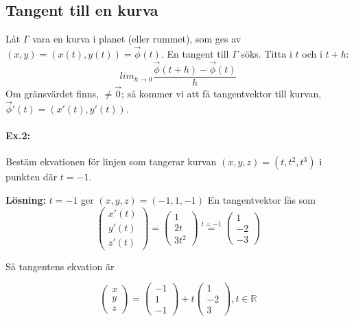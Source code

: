 \documentclass[a4paper,12pt]{article}
\begin{document}
\subsection{Tangent till en kurva}
Låt $\Gamma$ vara en kurva i planet (eller rummet), som ges av
$(x,y) = (x(t),y(t)) = \vec{\phi}(t)$. En tangent till $\Gamma$ söks.
Titta i $t$ och i $t+h$:
\begin{equation*}
  lim_{h \to 0}\frac{\vec{\phi}(t+h)-\vec{\phi}(t)}{h}
\end{equation*}
Om gränsvärdet finns, $\neq\vec{0}$; så kommer vi att få tangentvektor till
kurvan, $\vec{\phi}'(t) = (x'(t),y'(t))$.

\paragraph{Ex.2:}
  Bestäm ekvationen för linjen som tangerar kurvan $(x,y,z) = (t, t^2, t^3)$ i
  punkten där $t = -1$.

  \textbf{Lösning:} $t = -1$ ger $(x,y,z) = (-1,1,-1)$ En tangentvektor fås som
  \begin{equation*}
    \begin{pmatrix}
      x'(t)\\
      y'(t)\\
      z'(t)
    \end{pmatrix}
    =
    \begin{pmatrix}
      1 \\
      2t \\
      3t^2
    \end{pmatrix}
    \stackrel{t = -1}{=}
    \begin{pmatrix}
      1 \\
      -2 \\
      -3
    \end{pmatrix}
  \end{equation*}

  Så tangentens ekvation är

  \begin{equation*}
    \begin{pmatrix}
      x \\
      y \\
      z
    \end{pmatrix}
    =
    \begin{pmatrix}
      -1 \\
      1 \\
      -1
    \end{pmatrix}
    + t
    \begin{pmatrix}
      1 \\
      -2 \\
      3
    \end{pmatrix}, t \in \mathbb{R}
  \end{equation*}
\end{document}
